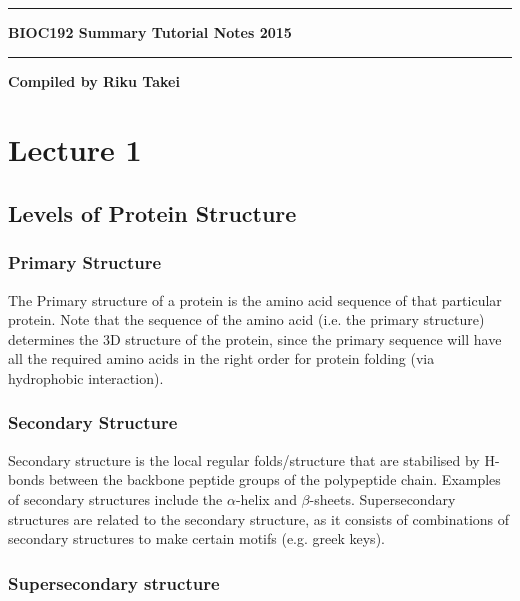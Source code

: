 \documentclass[a4paper, 12pt]{report}
\newcommand{\HRule}{\rule {\linewidth}{0.5mm}}
\newcommand{\mychapter}[2]{
    \setcounter{chapter}{#1}
    \setcounter{section}{0}
    \chapter*{#2}
    \addcontentsline{toc}{chapter}{#2}
}
\begin{document}
\begin{titlepage}

\begin{center}

\HRule
\vspace{0.4cm}
\Huge{\textbf{BIOC192 Summary Tutorial Notes 2015}}
\HRule

\vfill
\LARGE{\textbf{Compiled by Riku Takei}}

\end{center}

\end{titlepage}



%

\mychapter{1}{Lecture 1}

\section{Levels of Protein Structure}

\subsection{Primary Structure}

The Primary structure of a protein is the amino acid sequence of that particular protein.
Note that the sequence of the amino acid (i.e. the primary structure) determines the 3D structure of the protein, since the primary sequence will have all the required amino acids in the right order for protein folding (via hydrophobic interaction).

\subsection{Secondary Structure}

Secondary structure is the local regular folds/structure that are stabilised by H-bonds between the backbone peptide groups of the polypeptide chain.
Examples of secondary structures include the $\alpha$-helix and $\beta$-sheets.
Supersecondary structures are related to the secondary structure, as it consists of combinations of secondary structures to make certain motifs (e.g. greek keys).

\subsection{Supersecondary structure}
\end{document}
